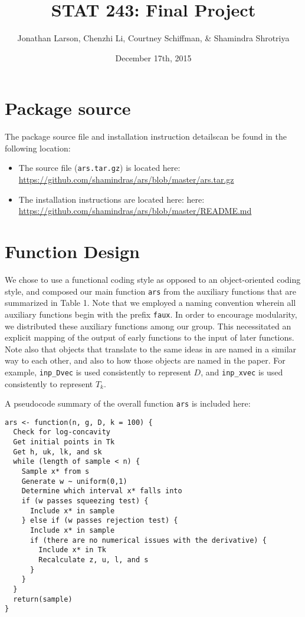 \documentclass{article}\usepackage[]{graphicx}\usepackage[]{color}
\begin{document}
 
\title{STAT 243: Final Project}
\author{Jonathan Larson, Chenzhi Li, Courtney Schiffman, \& Shamindra Shrotriya}
\date{December 17th, 2015}

\maketitle

\section{Package source}

The package source file and installation instruction detailscan be found in the following location:
\begin{itemize}
  \item The source file (\texttt{ars.tar.gz}) is located here: \url{https://github.com/shamindras/ars/blob/master/ars.tar.gz}
  \item The installation instructions are located here: here: \url{https://github.com/shamindras/ars/blob/master/README.md}
\end{itemize}

\section{Function Design}

We chose to use a functional coding style as opposed to an object-oriented coding style,
and composed our main function \texttt{ars} from the auxiliary functions
that are summarized in Table 1.
Note that we employed a naming convention wherein all auxiliary functions
begin with the prefix \texttt{faux}.
In order to encourage modularity, we distributed these auxiliary functions
among our group. This necessitated an explicit mapping of the output of early
functions to the input of later functions.
Note also that objects that translate to the same ideas in \cite{Gilks:Wild:1992} are named
in a similar way to each other, and also to how those objects are named
in the paper. For example, \texttt{inp\_Dvec} is used consistently
to represent $D$, and \texttt{inp\_xvec} is used consistently to represent
$T_k$.

A pseudocode summary of the overall function \texttt{ars} is included here:
\begin{verbatim}
ars <- function(n, g, D, k = 100) {
  Check for log-concavity
  Get initial points in Tk
  Get h, uk, lk, and sk
  while (length of sample < n) {
    Sample x* from s
    Generate w ~ uniform(0,1)
    Determine which interval x* falls into
    if (w passes squeezing test) {
      Include x* in sample
    } else if (w passes rejection test) {
      Include x* in sample
      if (there are no numerical issues with the derivative) {
        Include x* in Tk
        Recalculate z, u, l, and s
      }
    }
  }
  return(sample)
}
\end{verbatim}
\end{document}
